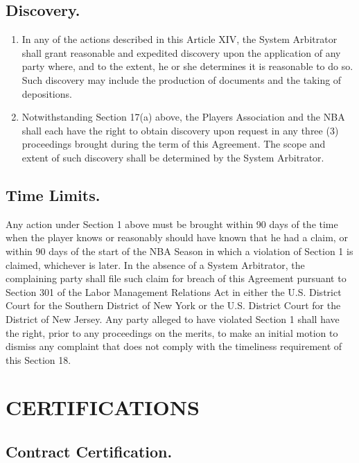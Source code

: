 \documentclass[
]{book}
\providecommand{\tightlist}{%
  \setlength{\itemsep}{0pt}\setlength{\parskip}{0pt}}
\begin{document}
\hypertarget{discovery.}{%
\section{Discovery.}\label{discovery.}}

\begin{enumerate}
\def\labelenumi{(\alph{enumi})}
\tightlist
\item
  In any of the actions described in this Article XIV, the System Arbitrator shall grant reasonable and expedited discovery upon the application of any party where, and to the extent, he or she determines it is reasonable to do so. Such discovery may include the production of documents and the taking of depositions.
\item
  Notwithstanding Section 17(a) above, the Players Association and the NBA shall each have the right to obtain discovery upon request in any three (3) proceedings brought during the term of this Agreement. The scope and extent of such discovery shall be determined by the System Arbitrator.
\end{enumerate}

\hypertarget{time-limits.}{%
\section{Time Limits.}\label{time-limits.}}

Any action under Section 1 above must be brought within 90 days of the time when the player knows or reasonably should have known that he had a claim, or within 90 days of the start of the NBA Season in which a violation of Section 1 is claimed, whichever is later. In the absence of a System Arbitrator, the complaining party shall file such claim for breach of this Agreement pursuant to Section 301 of the Labor Management Relations Act in either the U.S. District Court for the Southern District of New York or the U.S. District Court for the District of New Jersey. Any party alleged to have violated Section 1 shall have the right, prior to any proceedings on the merits, to make an initial motion to dismiss any complaint that does not comply with the timeliness requirement of this Section 18.

\hypertarget{certifications}{%
\chapter{CERTIFICATIONS}\label{certifications}}

\hypertarget{contract-certification.}{%
\section{Contract Certification.}\label{contract-certification.}}
\end{document}
